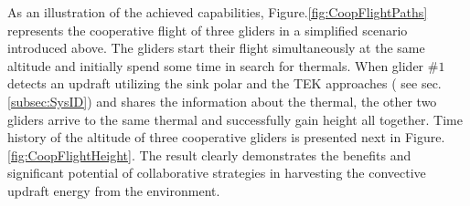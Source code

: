 \documentclass{ifacconf}
\begin{document}
%
%

As an illustration of the achieved capabilities, Figure.\ref{fig:CoopFlightPaths}
represents the cooperative flight of three gliders in a simplified scenario introduced
above. The gliders start their flight simultaneously at the same altitude and initially
spend some time in search for thermals. When glider $\#1$ detects an updraft utilizing
the sink polar and the TEK approaches ( see sec.\ref{subsec:SysID}) and shares the
information about the thermal, the other two gliders arrive to the same thermal and
successfully gain height all together. Time history of the altitude of three cooperative
gliders is presented next in Figure.\ref{fig:CoopFlightHeight}. The result clearly
demonstrates the benefits and significant potential of collaborative strategies in
harvesting the convective updraft energy from the environment.
\end{document}
